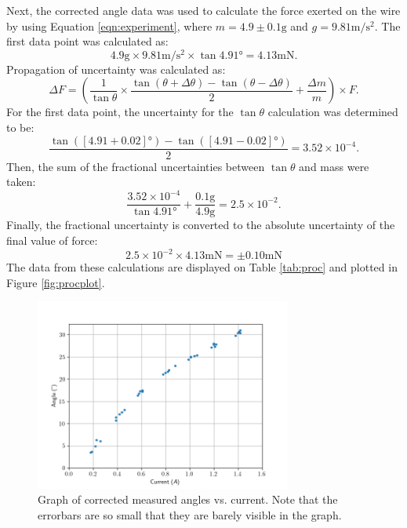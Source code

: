 Next, the corrected angle data was used to calculate the force exerted on the wire by using Equation \eqref{eqn:experiment}, where $m = 4.9\pm0.1\si{\gram}$ and $g = 9.81\si{\meter\per\second\squared}$. The first data point was calculated as:
\begin{equation*}
	4.9\si{\gram} \times 9.81\si{\meter\per\second\squared} \times \tan 4.91\si{\degree} = 4.13\si{\milli\newton} \text{.}
\end{equation*}
Propagation of uncertainty was calculated as:
\begin{equation*}
	\Delta F = \left( \frac{1}{\tan\theta} \times \frac{\tan(\theta + \Delta\theta) - \tan(\theta - \Delta\theta)}{2} + \frac{\Delta m}{m} \right) \times F \text{.}
\end{equation*}
For the first data point, the uncertainty for the $\tan\theta$ calculation was determined to be:
\begin{equation*}
	\frac{\tan([4.91 + 0.02]\si{\degree}) - \tan([4.91 - 0.02]\si{\degree})}{2} = 3.52\times10^{-4} \text{.}
\end{equation*}
Then, the sum of the fractional uncertainties between $\tan\theta$ and mass were taken:
\begin{equation*}
	\frac{3.52\times10^{-4}}{\tan 4.91\si{\degree}} + \frac{0.1\si{\gram}}{4.9\si{\gram}} = 2.5\times10^{-2} \text{.}
\end{equation*}
Finally, the fractional uncertainty is converted to the absolute uncertainty of the final value of force:
\begin{equation*}
	2.5\times10^{-2} \times 4.13\si{\milli\newton} = \pm 0.10\si{\milli\newton}
\end{equation*}
The data from these calculations are displayed on Table \ref{tab:proc} and plotted in Figure \ref{fig:procplot}.

\begin{figure}[t!]
	\centering
	\includegraphics[width=0.75\textwidth]{figures/rawplot.png}
	\caption{Graph of corrected measured angles vs. current. Note that the errorbars are so small that they are barely visible in the graph.}
	\label{fig:rawplot}
\end{figure}

